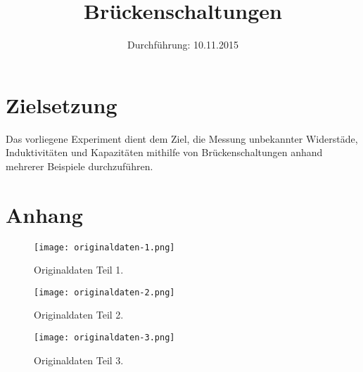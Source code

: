 

\subject{Versuchsprotokoll zum Versuch Nr. 302}
\title{Brückenschaltungen}
\date{
  Durchführung: 10.11.2015
}



\maketitle
\newpage

\section{Zielsetzung}
Das vorliegene Experiment dient dem Ziel, die Messung unbekannter Widerstäde, Induktivitäten und Kapazitäten mithilfe von Brückenschaltungen anhand mehrerer Beispiele durchzuführen.






\section{Anhang}
\begin{figure}[H]
  \centering
  \texttt{[image: originaldaten-1.png]}
  \caption{Originaldaten Teil 1.}
  \label{fig:original1}
\end{figure}

\begin{figure}[H]
  \centering
  \texttt{[image: originaldaten-2.png]}
  \caption{Originaldaten Teil 2.}
  \label{fig:original2}
\end{figure}

\begin{figure}[H]
  \centering
  \texttt{[image: originaldaten-3.png]}
  \caption{Originaldaten Teil 3.}
  \label{fig:original3}
\end{figure}

\printbibliography


